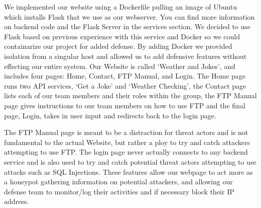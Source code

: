 We implemented our website using a Dockerfile pulling an image of Ubuntu which installs Flask that we use as our webserver. You can find more information on backend code and the Flask Server in the services section. We decided to use Flask based on previous experience with this service and Docker so we could containarize our project for added defense. By adding Docker we provided isolation from a singular host and allowed us to add defensive features without effecting our entire system. Our Website is called ‘Weather and Jokes’, and includes four pages: Home, Contact, FTP Manual, and Login. The Home page runs two API services, ‘Get a Joke’ and ‘Weather Checking’, the Contact page lists each of our team members and their roles within the group, the FTP Manual page gives instructions to our team members on how to use FTP and the final page, Login, takes in user input and redirects back to the login page. 

The FTP Manual page is meant to be a distraction for threat actors and is not fundamental to the actual Website, but rather a ploy to try and catch attackers attempting to use FTP. The login page never actually connects to any backend service and is also used to try and catch potential threat actors attempting to use attacks such as SQL Injections. These features allow our webpage to act more as a honeypot gathering information on potential attackers, and allowing our defense team to monitor/log their activities and if necessary block their IP address. 
